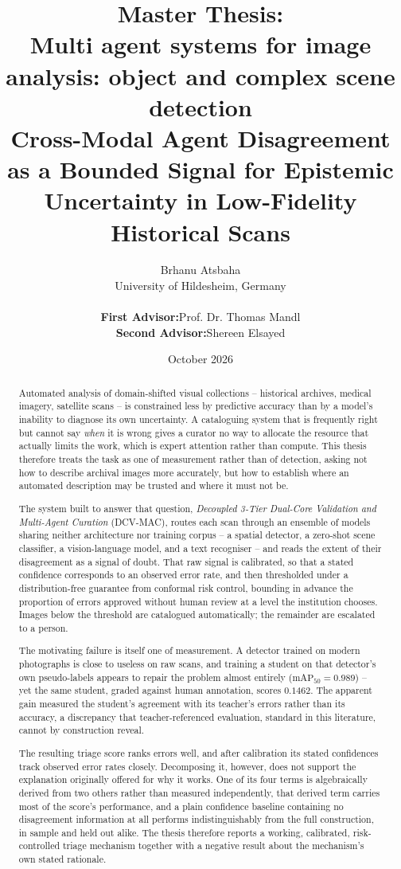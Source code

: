 \documentclass[12pt,a4paper]{report}
\title{\Large \textbf{Master Thesis:} \\[0.5cm]
\Huge \textbf{Multi agent systems for image analysis: object and complex scene detection} \\ [0.5cm]
\Large \textbf{Cross-Modal Agent Disagreement as a Bounded Signal for Epistemic Uncertainty in Low-Fidelity Historical Scans}}
\author{\large Brhanu Atsbaha \\
University of Hildesheim, Germany \\[0.4cm]
\begin{tabular}{ll}
\textbf{First Advisor:} & Prof. Dr. Thomas Mandl \\
\textbf{Second Advisor:} & Shereen Elsayed
\end{tabular}
}
\date{October 2026}
\begin{document}
\maketitle

\begin{abstract}
Automated analysis of domain-shifted visual collections -- historical archives, medical imagery, satellite scans -- is constrained less by predictive accuracy than by a model's inability to diagnose its own uncertainty. A cataloguing system that is frequently right but cannot say \emph{when} it is wrong gives a curator no way to allocate the resource that actually limits the work, which is expert attention rather than compute. This thesis therefore treats the task as one of measurement rather than of detection, asking not how to describe archival images more accurately, but how to establish where an automated description may be trusted and where it must not be.

The system built to answer that question, \textit{Decoupled 3-Tier Dual-Core Validation and Multi-Agent Curation} (DCV-MAC), routes each scan through an ensemble of models sharing neither architecture nor training corpus -- a spatial detector, a zero-shot scene classifier, a vision-language model, and a text recogniser -- and reads the extent of their disagreement as a signal of doubt. That raw signal is calibrated, so that a stated confidence corresponds to an observed error rate, and then thresholded under a distribution-free guarantee from conformal risk control, bounding in advance the proportion of errors approved without human review at a level the institution chooses. Images below the threshold are catalogued automatically; the remainder are escalated to a person.

The motivating failure is itself one of measurement. A detector trained on modern photographs is close to useless on raw scans, and training a student on that detector's own pseudo-labels appears to repair the problem almost entirely ($\text{mAP}_{50}=0.989$) -- yet the same student, graded against human annotation, scores $0.1462$. The apparent gain measured the student's agreement with its teacher's errors rather than its accuracy, a discrepancy that teacher-referenced evaluation, standard in this literature, cannot by construction reveal.

The resulting triage score ranks errors well, and after calibration its stated confidences track observed error rates closely. Decomposing it, however, does not support the explanation originally offered for why it works. One of its four terms is algebraically derived from two others rather than measured independently, that derived term carries most of the score's performance, and a plain confidence baseline containing no disagreement information at all performs indistinguishably from the full construction, in sample and held out alike. The thesis therefore reports a working, calibrated, risk-controlled triage mechanism together with a negative result about the mechanism's own stated rationale.


\end{abstract}
\end{document}
